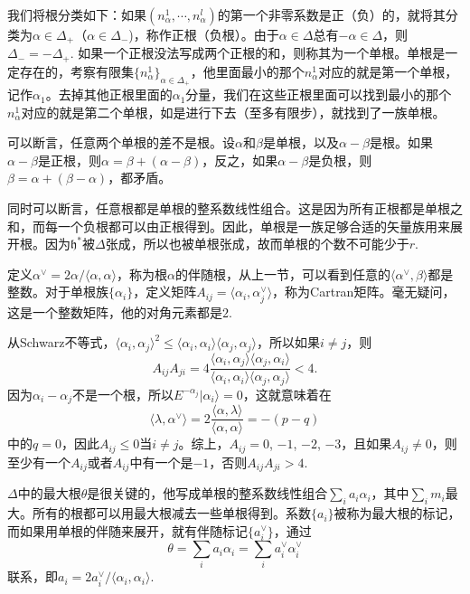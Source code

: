 \documentclass[9pt]{extarticle}
\begin{document}
我们将根分类如下：如果$(n^1_\alpha,\cdots,n^l_\alpha)$的第一个非零系数是正（负）的，就将其分类为$\alpha\in \Delta_+$（$\alpha\in \Delta_-$)，称作正根（负根）。由于$\alpha\in \Delta$总有$-\alpha\in \Delta$，则$\Delta_-=-\Delta_+$. 如果一个正根没法写成两个正根的和，则称其为一个单根。单根是一定存在的，考察有限集$\{n^1_\alpha\}_{\alpha\in \Delta_+}$，他里面最小的那个$n^1_\alpha$对应的就是第一个单根，记作$\alpha_1$。去掉其他正根里面的$\alpha_1$分量，我们在这些正根里面可以找到最小的那个$n^1_\alpha$对应的就是第二个单根，如是进行下去（至多有限步），就找到了一族单根。

\para 可以断言，任意两个单根的差不是根。设$\alpha$和$\beta$是单根，以及$\alpha-\beta$是根。如果$\alpha-\beta$是正根，则$\alpha=\beta+(\alpha-\beta)$，反之，如果$\alpha-\beta$是负根，则$\beta=\alpha+(\beta-\alpha)$，都矛盾。

同时可以断言，任意根都是单根的整系数线性组合。这是因为所有正根都是单根之和，而每一个负根都可以由正根得到。因此，单根是一族足够合适的矢量族用来展开根。因为$\mathfrak{h}^*$被$\Delta$张成，所以也被单根张成，故而单根的个数不可能少于$r$. 

\para 定义$\alpha^\vee=2\alpha/\langle \alpha,\alpha \rangle$，称为根$\alpha$的伴随根，从上一节，可以看到任意的$\langle \alpha^\vee,\beta\rangle$都是整数。对于单根族$\{\alpha_i\}$，定义矩阵$A_{ij}=\langle \alpha_i,\alpha^\vee_j\rangle$，称为Cartran矩阵。毫无疑问，这是一个整数矩阵，他的对角元素都是$2$.

从Schwarz不等式，$\langle \alpha_i,\alpha_j\rangle^2\leq \langle \alpha_i,\alpha_i\rangle\langle \alpha_j,\alpha_j\rangle$，所以如果$i\neq j$，则
\[
	A_{ij}A_{ji}=4\frac{\langle \alpha_i,\alpha_j\rangle\langle \alpha_j,\alpha_i\rangle}{\langle \alpha_i,\alpha_i\rangle\langle \alpha_j,\alpha_j\rangle}<4.
\]
因为$\alpha_i-\alpha_j$不是一个根，所以$E^{-\alpha_j}|\alpha_i\rangle =0$，这就意味着在
\[
	\langle \lambda,\alpha^\vee\rangle =2\frac{\langle\alpha,\lambda\rangle}{\langle \alpha,\alpha\rangle}=-(p-q)
\]
中的$q=0$，因此$A_{ij}\leq 0$当$i\neq j$。综上，$A_{ij}=0$, $-1$, $-2$, $-3$，且如果$A_{ij}\neq 0$，则至少有一个$A_{ij}$或者$A_{ij}$中有一个是$-1$，否则$A_{ij}A_{ji}>4$.

\para $\Delta$中的最大根$\theta$是很关键的，他写成单根的整系数线性组合$\sum_i a_i\alpha_i$，其中$\sum_i m_i$最大。所有的根都可以用最大根减去一些单根得到。系数$\{a_i\}$被称为最大根的标记，而如果用单根的伴随来展开，就有伴随标记$\{a^\vee_i\}$，通过
\[
	\theta=\sum_i a_i\alpha_i=\sum_i a^\vee_i\alpha^\vee_i
\]
联系，即$a_i=2a_i^\vee/\langle\alpha_i,\alpha_i\rangle$.
\end{document}
